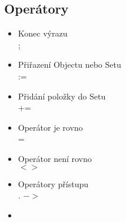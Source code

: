 \documentclass[11pt,a4paper]{article}   	%
\begin{document}
\subsection{Operátory}
\begin{itemize}
  	\item	Konec výrazu \\
			;
	\item	Přiřazení Objectu nebo Setu \\
			:=
	\item	Přidání položky do Setu \\
			+=
  	\item 	Operátor je rovno \\
			=
	\item 	Operátor není rovno \\
			$<>$
	\item  Operátory přístupu \\
			. $->$
	\item 
\end{itemize}
\end{document}
